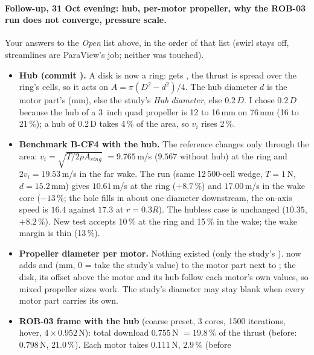 \paragraph{Follow-up, 31 Oct evening: hub, per-motor propeller, why the ROB-03 run does not converge, pressure scale.}
Your answers to the \emph{Open} list above, in the order of that list (swirl stays off, streamlines are ParaView's job; neither was touched).
\begin{itemize}[nosep]
  \item \textbf{Hub (commit ).} A disk is now a ring:  gets , the
        thrust is spread over the ring's cells, so it acts on $A=\pi(D^2-d^2)/4$. The hub diameter $d$ is the motor part's
         (mm), else the study's \emph{Hub diameter}, else $0.2\,D$. I chose $0.2\,D$ because the hub of a
        3~inch quad propeller is 12 to 16\,mm on 76\,mm (16 to 21\,\%); a hub of 0.2\,D takes 4\,\% of the area, so $v_i$ rises 2\,\%.
  \item \textbf{Benchmark B-CF4 with the hub.} The reference changes only through the area: $v_i=\sqrt{T/2\rho A_{ring}}$
        $=9.765$\,m/s ($9.567$ without hub) at the ring and $2v_i=19.53$\,m/s in the far wake. The run (same 12\,500-cell wedge,
        $T=1$\,N, $d=15.2$\,mm) gives $10.61$\,m/s at the ring ($+8.7\,\%$) and $17.00$\,m/s in the wake core ($-13\,\%$; the hole
        fills in about one diameter downstream, the on-axis speed is $16.4$ against $17.3$ at $r=0.3R$). The hubless case is
        unchanged ($10.35$, $+8.2\,\%$). New test  accepts 10\,\% at
        the ring and 15\,\% in the wake; the wake margin is thin (13\,\%).
  \item \textbf{Propeller diameter per motor.} Nothing existed (only the study's ).  now adds
         and  (mm, 0 = take the study's value) to the motor part next to ;
        the disk, its offset above the motor and its hub follow each motor's own values, so mixed propeller sizes work. The
        study's diameter may stay blank when every motor part carries its own.
  \item \textbf{ROB-03 frame with the hub} (coarse preset, 3 cores, 1500 iterations, hover, $4\times0.952$\,N): total download
        $0.755$\,N $=19.8\,\%$ of the thrust (before: $0.798$\,N, $21.0\,\%$). Each motor takes $0.111$\,N, $2.9\,\%$ (before

\end{itemize}

